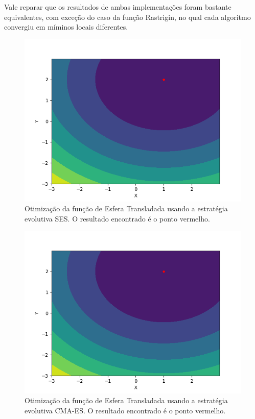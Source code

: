 \documentclass[conference]{IEEEtran}
\begin{document}
Vale reparar que os resultados de ambas implementações foram bastante equivalentes, com exceção do caso da função Rastrigin, no qual cada algoritmo convergiu em míminos locais diferentes.

\begin{figure}[htbp]
\centering
\centerline{\includegraphics[scale=0.5]{imagens/translated_sphere/ses.png}}
\caption{Otimização da função de Esfera Transladada usando a estratégia evolutiva SES. O resultado encontrado é o ponto vermelho.}
\label{translated_sphere/ses}
\end{figure}

\begin{figure}[htbp]
\centering
\centerline{\includegraphics[scale=0.5]{imagens/translated_sphere/cmaes.png}}
\caption{Otimização da função de Esfera Transladada usando a estratégia evolutiva CMA-ES. O resultado encontrado é o ponto vermelho.}
\label{translated_sphere/cmaes}
\end{figure}
\end{document}
